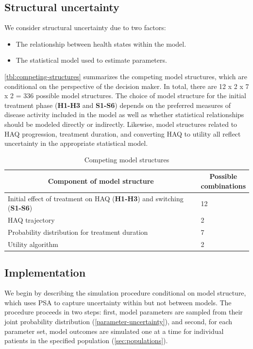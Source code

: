 \documentclass[11pt,final,fleqn]{article}\usepackage[]{graphicx}\usepackage[]{color}
\theoremstyle{plain}
\begin{document}
\subsection{Structural uncertainty}\label{stuctural-uncertainty}
We consider structural uncertainty due to two factors:

\begin{itemize}
\item The relationship between health states within the model.
\item The statistical model used to estimate parameters.
\end{itemize}

\autoref{tbl:competing-structures} summarizes the competing model structures, which are conditional on the perspective of the decision maker. In total, there are 12 x 2 x 7 x 2 = 336 possible model structures. The choice of model structure for the initial treatment phase (\textbf{H1-H3} and \textbf{S1-S6}) depends on the preferred measures of disease activity included in the model as well as whether statistical relationships should be modeled directly or indirectly. Likewise, model structures related to HAQ progression, treatment duration, and converting HAQ to utility all reflect uncertainty in the appropriate statistical model. 

\renewcommand{\arraystretch}{1.5}

\begin{table}[!ht]
\begin{center}
\begin{threeparttable}
\caption{Competing model structures} \label{tbl:competing-structures}
\begin{tabular}{p{0.80\linewidth}p{0.20\linewidth}}
\hline
\multicolumn{1}{c}{Component of model structure} & \multicolumn{1}{c}{Possible combinations} \\
\hline
Initial effect of treatment on HAQ (\textbf{H1-H3}) and switching (\textbf{S1-S6}) & 12  \\
HAQ trajectory & 2 \\
Probability distribution for treatment duration & 7 \\
Utility algorithm & 2 \\
\hline
\end{tabular}
\end{threeparttable}
\end{center}
\end{table}\renewcommand{\arraystretch}{1}


\subsection{Implementation}\label{implementation}
We begin by describing the simulation procedure conditional on model structure, which uses PSA to capture uncertainty within but not between models. The procedure proceeds in two steps: first, model parameters are sampled from their joint probability distribution (\autoref{parameter-uncertainty}), and second, for each parameter set, model outcomes are simulated one at a time for individual patients in the specified population (\autoref{sec:populations}).   
\end{document}
